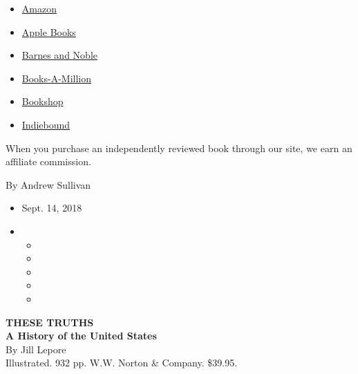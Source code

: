 \begin{itemize}
\tightlist
\item
  \href{https://www.amazon.com/gp/search?index=books\&tag=NYTBSREV-20\&field-keywords=These+Truths\%3A+A+History+of+the+United+States+Jill+Lepore}{Amazon}
\item
  \href{https://du-gae-books-dot-nyt-du-prd.appspot.com/buy?title=These+Truths\%3A+A+History+of+the+United+States\&author=Jill+Lepore}{Apple
  Books}
\item
  \href{https://www.anrdoezrs.net/click-7990613-11819508?url=https\%3A\%2F\%2Fwww.barnesandnoble.com\%2Fw\%2F\%3Fean\%3D9780393635249}{Barnes
  and Noble}
\item
  \href{https://www.anrdoezrs.net/click-7990613-35140?url=https\%3A\%2F\%2Fwww.booksamillion.com\%2Fp\%2FThese\%2BTruths\%253A\%2BA\%2BHistory\%2Bof\%2Bthe\%2BUnited\%2BStates\%2FJill\%2BLepore\%2F9780393635249}{Books-A-Million}
\item
  \href{https://bookshop.org/a/3546/9780393635249}{Bookshop}
\item
  \href{https://www.indiebound.org/book/9780393635249?aff=NYT}{Indiebound}
\end{itemize}

When you purchase an independently reviewed book through our site, we
earn an affiliate commission.

By Andrew Sullivan

\begin{itemize}
\item
  Sept. 14, 2018
\item
  \begin{itemize}
  \item
  \item
  \item
  \item
  \item
  \end{itemize}
\end{itemize}

\textbf{THESE TRUTHS}\\
\textbf{A History of the United States}\\
By Jill Lepore\\
Illustrated. 932 pp. W.W. Norton \& Company. \$39.95.

